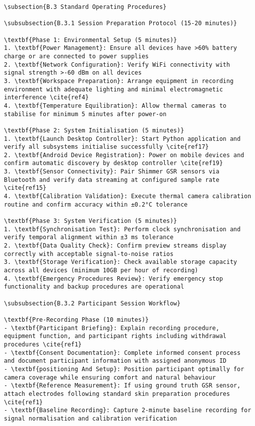\begin{verbatim}
\subsection{B.3 Standard Operating Procedures}

\subsubsection{B.3.1 Session Preparation Protocol (15-20 minutes)}

\textbf{Phase 1: Environmental Setup (5 minutes)}
1. \textbf{Power Management}: Ensure all devices have >60% battery charge or are connected to power supplies
2. \textbf{Network Configuration}: Verify WiFi connectivity with signal strength >-60 dBm on all devices
3. \textbf{Workspace Preparation}: Arrange equipment in recording environment with adequate lighting and minimal electromagnetic interference \cite{ref4}
4. \textbf{Temperature Equilibration}: Allow thermal cameras to stabilise for minimum 5 minutes after power-on

\textbf{Phase 2: System Initialisation (5 minutes)}
1. \textbf{Launch Desktop Controller}: Start Python application and verify all subsystems initialise successfully \cite{ref17}
2. \textbf{Android Device Registration}: Power on mobile devices and confirm automatic discovery by desktop controller \cite{ref19}
3. \textbf{Sensor Connectivity}: Pair Shimmer GSR sensors via Bluetooth and verify data streaming at configured sample rate \cite{ref15}
4. \textbf{Calibration Validation}: Execute thermal camera calibration routine and confirm accuracy within ±0.2°C tolerance

\textbf{Phase 3: System Verification (5 minutes)}
1. \textbf{Synchronisation Test}: Perform clock synchronisation and verify temporal alignment within ±3 ms tolerance
2. \textbf{Data Quality Check}: Confirm preview streams display correctly with acceptable signal-to-noise ratios
3. \textbf{Storage Verification}: Check available storage capacity across all devices (minimum 10GB per hour of recording)
4. \textbf{Emergency Procedures Review}: Verify emergency stop functionality and backup procedures are operational

\subsubsection{B.3.2 Participant Session Workflow}

\textbf{Pre-Recording Phase (10 minutes)}
- \textbf{Participant Briefing}: Explain recording procedure, equipment function, and participant rights including withdrawal procedures \cite{ref1}
- \textbf{Consent Documentation}: Complete informed consent process and document participant information with assigned anonymous ID
- \textbf{positioning And Setup}: Position participant optimally for camera coverage while ensuring comfort and natural behaviour
- \textbf{Reference Measurement}: If using ground truth GSR sensor, attach electrodes following standard skin preparation procedures \cite{ref1}
- \textbf{Baseline Recording}: Capture 2-minute baseline recording for signal normalisation and calibration verification


\end{verbatim}

